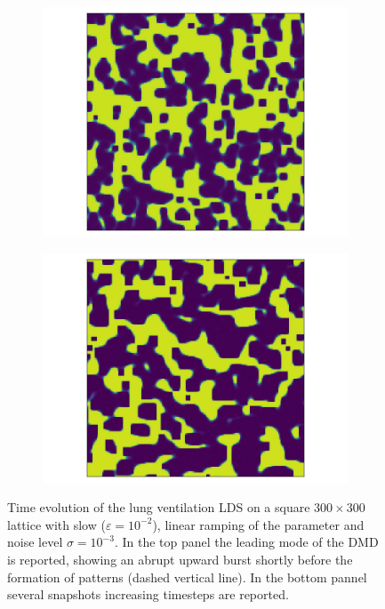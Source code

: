\documentclass[../main.tex]{subfiles}
\begin{document}
\begin{figure}[H]
\begin{subfigure}[b]{0.11\textwidth}
        \includegraphics[keepaspectratio, width = \linewidth]{../figures/fig3.9.2.7.png}
    \end{subfigure}
    \hfill
    \begin{subfigure}[b]{0.11\textwidth}
        \centering 
        \includegraphics[keepaspectratio, width = \linewidth]{../figures/fig3.9.2.8.png}
    \end{subfigure}
    \caption{Time evolution of the lung ventilation LDS on a square $300\times300$ lattice with slow ($\varepsilon=10^{-2}$), linear ramping of the parameter and noise level $\sigma=10^{-3}$. 
    In the top panel the leading mode of the DMD is reported, showing an abrupt upward burst shortly before the formation of patterns (dashed vertical line). 
In the bottom pannel several snapshots increasing timesteps are reported.}
    \label{fig3.9}
\end{figure}
\end{document}
